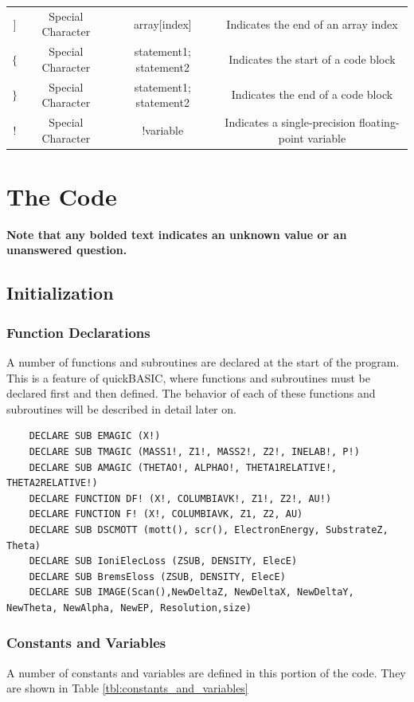 \documentclass[10pt, reqno]{exam}
\begin{document}
\begin{table}[h]
\begin{tabular}{|c|c|c|c|}
    $]$ & Special Character & array[index] & Indicates the end of an array index \\
    $\{$ & Special Character & { statement1; statement2 } & Indicates the start of a code block \\
    $\}$ & Special Character & { statement1; statement2 } & Indicates the end of a code block \\
    ! & Special Character & !variable & Indicates a single-precision floating-point variable \\
    \hline
    \end{tabular}
\end{table}
\section{The Code}
\textbf{Note that any bolded text indicates an unknown value or an unanswered question.}
\subsection{Initialization}
\subsubsection{Function Declarations}

A number of functions and subroutines are declared at the start of the program. This is a feature of quickBASIC, where functions and subroutines must be declared first and then defined. The behavior of each of these functions and subroutines will be described in detail later on.

\begin{verbatim}
    DECLARE SUB EMAGIC (X!)
    DECLARE SUB TMAGIC (MASS1!, Z1!, MASS2!, Z2!, INELAB!, P!)
    DECLARE SUB AMAGIC (THETAO!, ALPHAO!, THETA1RELATIVE!, THETA2RELATIVE!)
    DECLARE FUNCTION DF! (X!, COLUMBIAVK!, Z1!, Z2!, AU!)
    DECLARE FUNCTION F! (X!, COLUMBIAVK, Z1, Z2, AU)
    DECLARE SUB DSCMOTT (mott(), scr(), ElectronEnergy, SubstrateZ, Theta)
    DECLARE SUB IoniElecLoss (ZSUB, DENSITY, ElecE)
    DECLARE SUB BremsEloss (ZSUB, DENSITY, ElecE)
    DECLARE SUB IMAGE(Scan(),NewDeltaZ, NewDeltaX, NewDeltaY, NewTheta, NewAlpha, NewEP, Resolution,size)
\end{verbatim}
\subsubsection{Constants and Variables} 
A number of constants and variables are defined in this portion of the code. They are shown in Table \ref{tbl:constants_and_variables}
\pagebreak
\end{document}
